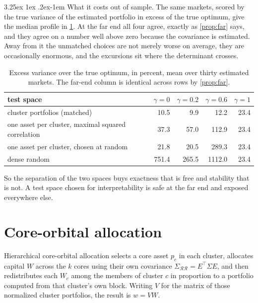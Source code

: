 \documentclass[11pt]{article}
\makeatletter
\renewcommand\paragraph{\@startsection{paragraph}{4}{\z@}%
  {3.25ex \@plus1ex \@minus.2ex}{-1em}%
  {\normalfont\normalsize\itshape}}
\makeatother
\begin{document}
\paragraph{What it costs out of sample.} The same markets, scored by the true
variance of the estimated portfolio in excess of the true optimum, give the
median profile in \cref{tab:oos}. At the far end all four agree, exactly as
\cref{prop:far} says, and they agree on a number well above zero because the
covariance is estimated. Away from it the unmatched choices are not merely worse
on average, they are occasionally enormous, and the excursions sit where the
determinant crosses.

\begin{table}[ht]
\centering
\begin{tabular}{@{}lrrrr@{}}
\toprule
test space & $\gamma=0$ & $\gamma=0.2$ & $\gamma=0.6$ & $\gamma=1$ \\
\midrule
cluster portfolios (matched) & 10.5 & 9.9 & 12.2 & 23.4 \\
one asset per cluster, maximal squared correlation & 37.3 & 57.0 & 112.9 & 23.4 \\
one asset per cluster, chosen at random & 21.8 & 20.5 & 289.3 & 23.4 \\
dense random & 751.4 & 265.5 & 1112.0 & 23.4 \\
\bottomrule
\end{tabular}
\caption{Excess variance over the true optimum, in percent, mean over thirty
estimated markets. The far-end column is identical across rows by
\cref{prop:far}.}
\label{tab:oos}
\end{table}

So the separation of the two spaces buys exactness that is free and stability
that is not. A test space chosen for interpretability is safe at the far end and
exposed everywhere else.

\section{Core-orbital allocation}
\label{sec:hcoa}

Hierarchical core-orbital allocation \cite{bajo2026} selects a core asset $p_c$
in each cluster, allocates capital $W$ across the $k$ cores using their own
covariance $\Sigma_{\mathcal{R}\mathcal{R}}=E^\top\Sigma E$, and then
redistributes each $W_c$ among the members of cluster $c$ in proportion to a
portfolio computed from that cluster's own block. Writing $V$ for the matrix of
those normalized cluster portfolios, the result is $w=VW$.
\end{document}
